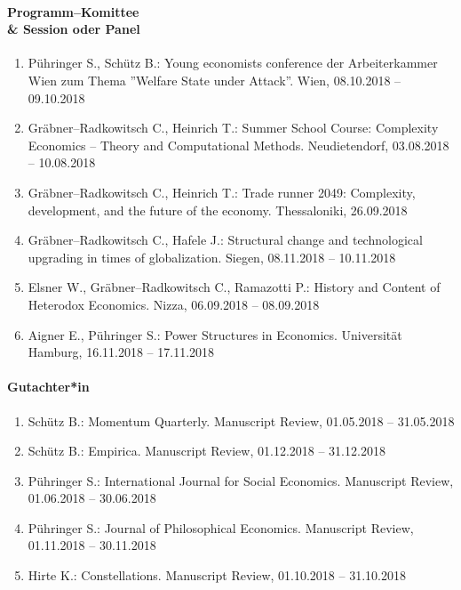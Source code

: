 \paragraph{Programm--Komittee \\\& Session oder Panel}
\begin{enumerate}[leftmargin=*, labelsep=0.5cm]
\item Pühringer S., Schütz B.: Young economists conference der Arbeiterkammer Wien zum Thema ''Welfare State under Attack''. Wien, 08.10.2018 -- 09.10.2018
\item Gräbner--Radkowitsch C., Heinrich T.: Summer School Course: Complexity Economics -- Theory and Computational Methods. Neudietendorf, 03.08.2018 -- 10.08.2018
\item Gräbner--Radkowitsch C., Heinrich T.: Trade runner 2049: Complexity, development, and the future of the economy. Thessaloniki, 26.09.2018
\item Gräbner--Radkowitsch C., Hafele J.: Structural change and technological upgrading in times of globalization. Siegen, 08.11.2018 -- 10.11.2018
\item Elsner W., Gräbner--Radkowitsch C., Ramazotti P.: History and Content of Heterodox Economics. Nizza, 06.09.2018 -- 08.09.2018
\item Aigner E., Pühringer S.: Power Structures in Economics. Universität Hamburg, 16.11.2018 -- 17.11.2018
\end{enumerate}

\paragraph{Gutachter*in}
\begin{enumerate}[leftmargin=*, labelsep=0.5cm]
\item Schütz B.: Momentum Quarterly. Manuscript Review, 01.05.2018 -- 31.05.2018
\item Schütz B.: Empirica. Manuscript Review, 01.12.2018 -- 31.12.2018
\item Pühringer S.: International Journal for Social Economics. Manuscript Review, 01.06.2018 -- 30.06.2018
\item Pühringer S.: Journal of Philosophical Economics. Manuscript Review, 01.11.2018 -- 30.11.2018
\item Hirte K.: Constellations. Manuscript Review, 01.10.2018 -- 31.10.2018
\end{enumerate}

